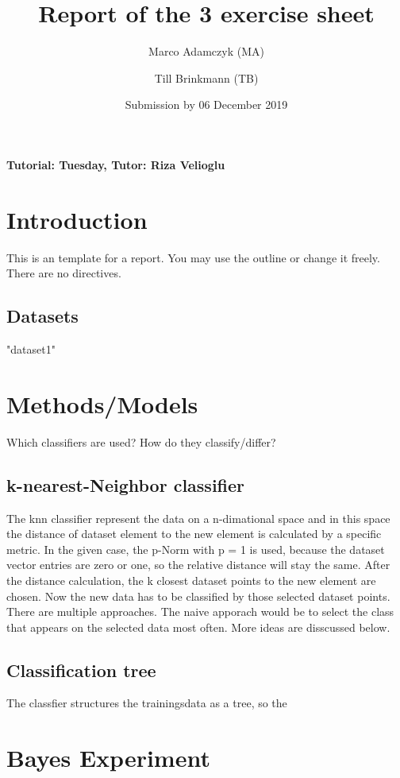 \documentclass[a4paper,12pt]{article}
\title{Report of the 3\ts{rd} exercise sheet}
\author{Marco Adamczyk (MA) \and Till Brinkmann (TB)}
\date{Submission by 06\ts{th} December 2019}
\newcommand{\initials}[1]{\marginpar{\quad\texttt{#1}}}
\begin{document}

\pagestyle{myheadings}
    
\maketitle

\begin{center}
    \textbf{Tutorial: Tuesday, Tutor: Riza Velioglu}
\end{center}

\section{Introduction}
This is an template for a report. You may use the outline or change it freely. There are no directives.
\subsection{Datasets}
"dataset1"


\section{Methods/Models}
Which classifiers are used? How do they classify/differ?

\subsection{k-nearest-Neighbor classifier}
The knn classifier represent the data on a n-dimational space and in this space the distance of dataset element to the new element is calculated by a specific metric. In the given case, the p-Norm with p = 1 is used, because the dataset vector entries are zero or one, so the relative distance will stay the same.
After the distance calculation, the k closest dataset points to the new element are chosen. Now the new data has to be classified by those selected dataset points. There are multiple approaches. The naive apporach would be to select the class that appears on the selected data most often. More ideas are disscussed below.
\initials{MA}
\subsection{Classification tree}
The classfier structures the trainingsdata as a tree, so the 
\initials{MA}
\section{Bayes Experiment}
\end{document}
